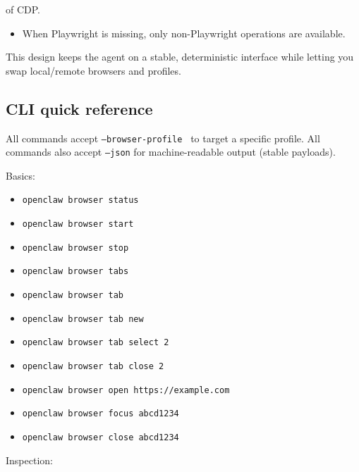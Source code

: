 of CDP.
\begin{itemize}
  \item When Playwright is missing, only non-Playwright operations are available.
\end{itemize}


This design keeps the agent on a stable, deterministic interface while letting
you swap local/remote browsers and profiles.

\subsection{CLI quick reference}


All commands accept \texttt{--browser-profile } to target a specific profile.
All commands also accept \texttt{--json} for machine-readable output (stable payloads).

Basics:

\begin{itemize}
  \item \texttt{openclaw browser status}
  \item \texttt{openclaw browser start}
  \item \texttt{openclaw browser stop}
  \item \texttt{openclaw browser tabs}
  \item \texttt{openclaw browser tab}
  \item \texttt{openclaw browser tab new}
  \item \texttt{openclaw browser tab select 2}
  \item \texttt{openclaw browser tab close 2}
  \item \texttt{openclaw browser open https://example.com}
  \item \texttt{openclaw browser focus abcd1234}
  \item \texttt{openclaw browser close abcd1234}
\end{itemize}


Inspection:

